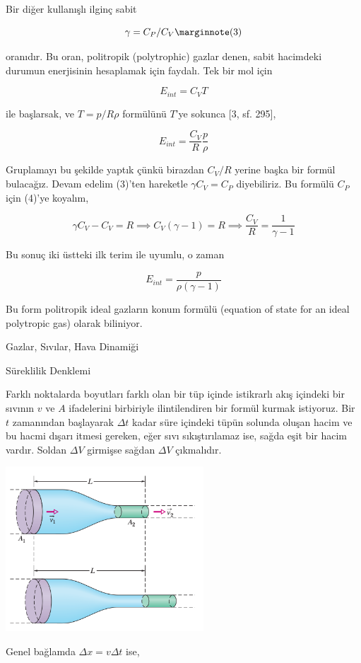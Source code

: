 \documentclass[12pt,fleqn]{article}\usepackage{../../common}
\begin{document}
Bir diğer kullanışlı ilginç sabit

$$
\gamma = C_P / C_V
\mlabel{3}
$$

oranıdır. Bu oran, politropik (polytrophic) gazlar denen, sabit hacimdeki
durumun enerjisinin hesaplamak için faydalı. Tek bir mol için

$$
E_{int} = C_V T
$$

ile başlarsak, ve $T = p / R\rho$ formülünü $T$'ye sokunca [3, sf. 295],

$$
E_{int} = \frac{C_V}{R} \frac{p}{\rho}
$$

Gruplamayı bu şekilde yaptık çünkü birazdan $C_V/R$ yerine başka bir formül
bulacağız. Devam edelim (3)'ten hareketle $\gamma C_V = C_P$ diyebiliriz. Bu
formülü $C_P$ için (4)'ye koyalım,

$$
\gamma C_V - C_V = R \implies C_V(\gamma-1) = R \implies \frac{C_V}{R} =
\frac{1}{\gamma-1}
$$

Bu sonuç iki üstteki ilk terim ile uyumlu, o zaman 

$$
E_{int} = \frac{p}{\rho (\gamma - 1)}
$$

Bu form politropik ideal gazların konum formülü (equation of state for an ideal
polytropic gas) olarak biliniyor.

Gazlar, Sıvılar, Hava Dinamiği

Süreklilik Denklemi

Farklı noktalarda boyutları farklı olan bir tüp içinde istikrarlı akış içindeki
bir sıvının $v$ ve $A$ ifadelerini birbiriyle ilintilendiren bir formül kurmak
istiyoruz. Bir $t$ zamanından başlayarak $\Delta t$ kadar süre içindeki tüpün
solunda oluşan hacim ve bu hacmi dışarı itmesi gereken, eğer sıvı sıkıştırılamaz
ise, sağda eşit bir hacim vardır. Soldan $\Delta V$ girmişse sağdan $\Delta V$
çıkmalıdır.

\includegraphics[width=20em]{phy_045_flight_01.png}

Genel bağlamda $\Delta x = v \Delta t$ ise,
\end{document}
